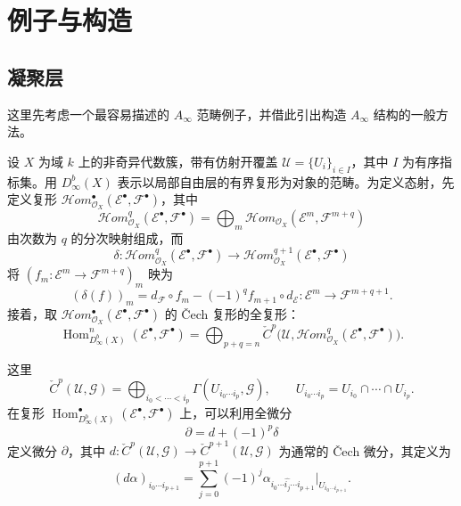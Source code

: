 \section{例子与构造}\label{sec:8.2}
\setcounter{equation}{8}
\setcounter{figure}{9}
\subsection{凝聚层}\label{sec:8.2.1}

这里先考虑一个最容易描述的 $A_\infty$ 范畴例子，并借此引出构造 $A_\infty$ 结构的一般方法。

设 $X$ 为域 $k$ 上的非奇异代数簇，带有仿射开覆盖 $\mathcal U=\{U_i\}_{i\in I}$，其中 $I$ 为有序指标集。用 $D^b_\infty(X)$ 表示以局部自由层的有界复形为对象的范畴。为定义态射，先定义复形 $\mathcal{H}om^\bullet_{\mathcal O_X}(\mathcal E^\bullet,\mathcal F^\bullet)$，其中
\[
\mathcal{H}om^q_{\mathcal O_X}(\mathcal E^\bullet,\mathcal F^\bullet)
=\bigoplus_m\mathcal{H}om_{\mathcal O_X}(\mathcal E^m,\mathcal F^{m+q})
\]
由次数为 $q$ 的分次映射组成，而
\[
\delta\colon
\mathcal{H}om^q_{\mathcal O_X}(\mathcal E^\bullet,\mathcal F^\bullet)
\longrightarrow
\mathcal{H}om^{q+1}_{\mathcal O_X}(\mathcal E^\bullet,\mathcal F^\bullet)
\]
将 $(f_m\colon\mathcal E^m\to\mathcal F^{m+q})_m$ 映为
\[
(\delta(f))_m
=d_{\mathcal F}\circ f_m-(-1)^q f_{m+1}\circ d_{\mathcal E}
\colon\mathcal E^m\longrightarrow\mathcal F^{m+q+1}.
\]
接着，取 $\mathcal{H}om^\bullet_{\mathcal O_X}(\mathcal E^\bullet,\mathcal F^\bullet)$ 的 Čech 复形的全复形：
\[
\operatorname{Hom}^n_{D^b_\infty(X)}(\mathcal E^\bullet,\mathcal F^\bullet)
=\bigoplus_{p+q=n}
\check C^p\bigl(\mathcal U,
\mathcal{H}om^q_{\mathcal O_X}(\mathcal E^\bullet,\mathcal F^\bullet)\bigr).
\]

这里
\[
\check C^p(\mathcal U,\mathcal G)
=\bigoplus_{i_0<\cdots<i_p}\Gamma(U_{i_0\cdots i_p},\mathcal G),
\qquad
U_{i_0\cdots i_p}=U_{i_0}\cap\cdots\cap U_{i_p}.
\]
在复形 $\operatorname{Hom}^\bullet_{D^b_\infty(X)}(\mathcal E^\bullet,\mathcal F^\bullet)$ 上，可以利用全微分
\[
\partial=d+(-1)^p\delta
\]
定义微分 $\partial$，其中 $d\colon\check C^p(\mathcal U,\mathcal G)\to\check C^{p+1}(\mathcal U,\mathcal G)$ 为通常的 Čech 微分，其定义为
\[
(d\alpha)_{i_0\cdots i_{p+1}}
=\sum_{j=0}^{p+1}(-1)^j
\alpha_{i_0\cdots\widehat{i_j}\cdots i_{p+1}}
\big|_{U_{i_0\cdots i_{p+1}}}.
\]

